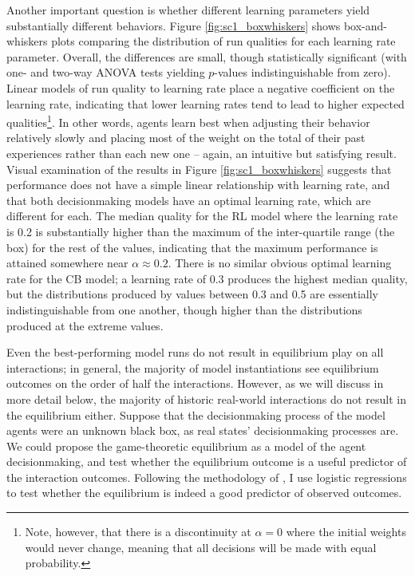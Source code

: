 Another important question is whether different learning parameters yield substantially different behaviors. Figure \ref{fig:sc1_boxwhiskers} shows box-and-whiskers plots comparing the distribution of run qualities for each learning rate parameter. Overall, the differences are small, though statistically significant (with one- and two-way ANOVA tests yielding $p$-values indistinguishable from zero). Linear models of run quality to learning rate place a negative coefficient on the learning rate, indicating that lower learning rates tend to lead to higher expected qualities\footnote{Note, however, that there is a discontinuity at $\alpha=0$ where the initial weights would never change, meaning that all decisions will be made with equal probability.}. In other words, agents learn best when adjusting their behavior relatively slowly and placing most of the weight on the total of their past experiences rather than each new one -- again, an intuitive but satisfying result. Visual examination of the results in Figure \ref{fig:sc1_boxwhiskers} suggests that performance does not have a simple linear relationship with learning rate, and that both decisionmaking models have an optimal learning rate, which are different for each. The median quality for the RL model where the learning rate is 0.2 is substantially higher than the maximum of the inter-quartile range (the box) for the rest of the values, indicating that the maximum performance is attained somewhere near $\alpha \approx 0.2$. There is no similar obvious optimal learning rate for the CB model; a learning rate of 0.3 produces the highest median quality, but the distributions produced by values between 0.3 and 0.5 are essentially indistinguishable from one another, though higher than the distributions produced at the extreme values.

Even the best-performing model runs do not result in equilibrium play on all interactions; in general, the majority of model instantiations see equilibrium outcomes on the order of half the interactions. However, as we will discuss in more detail below, the majority of historic real-world interactions do not result in the equilibrium either. Suppose that the decisionmaking process of the model agents were an unknown black box, as real states' decisionmaking processes are. We could propose the game-theoretic equilibrium as a model of the agent decisionmaking, and test whether the equilibrium outcome is a useful predictor of the interaction outcomes. Following the methodology of \citet{bennett_2000}, I use logistic regressions to test whether the equilibrium is indeed a good predictor of observed outcomes.

